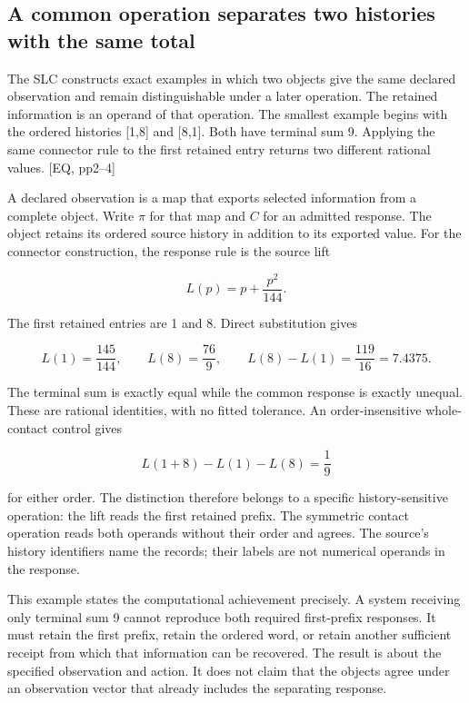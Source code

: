 \label{equal-observations-and-executable-histories}

\subsection{A common operation separates two histories with the same total}\label{a-common-operation-separates-two-histories-with-the-same-total}

The SLC constructs exact examples in which two objects give the same declared observation and remain distinguishable under a later operation. The retained information is an operand of that operation. The smallest example begins with the ordered histories {[}1,8{]} and {[}8,1{]}. Both have terminal sum 9. Applying the same connector rule to the first retained entry returns two different rational values. {[}EQ, pp2--4{]}

A declared observation is a map that exports selected information from a complete object. Write \(\pi\) for that map and \(C\) for an admitted response. The object retains its ordered source history in addition to its exported value. For the connector construction, the response rule is the source lift

\[
L(p)=p+\frac{p^2}{144}.
\]

The first retained entries are 1 and 8. Direct substitution gives

\[
L(1)=\frac{145}{144},\qquad L(8)=\frac{76}{9},\qquad L(8)-L(1)=\frac{119}{16}=7.4375.
\]

The terminal sum is exactly equal while the common response is exactly unequal. These are rational identities, with no fitted tolerance. An order-insensitive whole-contact control gives

\[
L(1+8)-L(1)-L(8)=\frac{1}{9}
\]

for either order. The distinction therefore belongs to a specific history-sensitive operation: the lift reads the first retained prefix. The symmetric contact operation reads both operands without their order and agrees. The source's history identifiers name the records; their labels are not numerical operands in the response.

This example states the computational achievement precisely. A system receiving only terminal sum 9 cannot reproduce both required first-prefix responses. It must retain the first prefix, retain the ordered word, or retain another sufficient receipt from which that information can be recovered. The result is about the specified observation and action. It does not claim that the objects agree under an observation vector that already includes the separating response.

